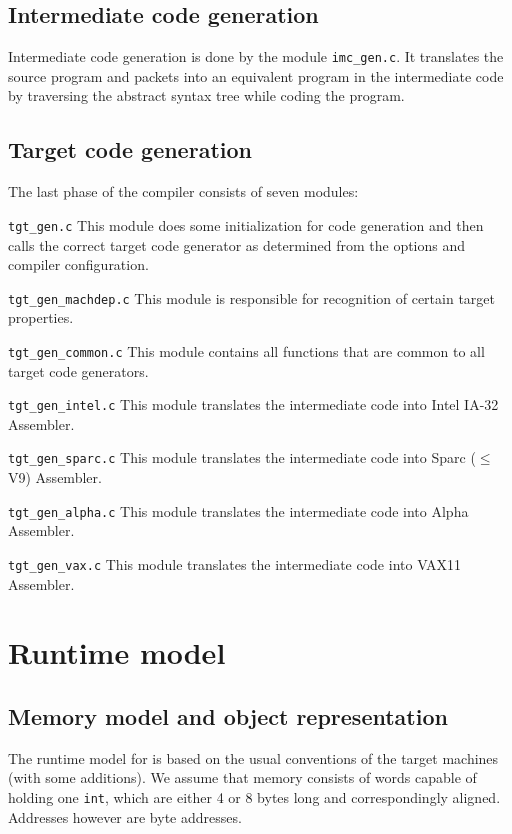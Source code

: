 \documentclass [a4paper,12pt,fleqn]{article}
\begin{document}
\subsection {Intermediate code generation}
Intermediate code generation is done by the module {\tt imc\_gen.c}.
It translates the source program and packets into an equivalent program
in the intermediate code by traversing the abstract syntax tree while
coding the program.
\subsection {Target code generation}
The last phase of the compiler consists of seven modules:
\begin{list}{-}{}
\item [ {\tt tgt\_gen.c} ]
This module does some initialization for code generation and then
calls the correct target code generator as determined from the options
and compiler configuration.
\item [ {\tt tgt\_gen\_machdep.c} ]
This module is responsible for recognition of certain target properties.
\item [ {\tt tgt\_gen\_common.c} ]
This module contains all functions that are common to all target code
generators.
\item [ {\tt tgt\_gen\_intel.c} ]
This module translates the intermediate code into Intel IA-32 Assembler.
\item [ {\tt tgt\_gen\_sparc.c} ]
This module translates the intermediate code into Sparc ($ \leq $V9) Assembler.
\item [ {\tt tgt\_gen\_alpha.c} ]
This module translates the intermediate code into Alpha Assembler.
\item [ {\tt tgt\_gen\_vax.c} ]
This module translates the intermediate code into VAX11 Assembler.
\end{list}
\section {Runtime model}
\subsection {Memory model and object representation}
The runtime model for \ELAN is based on the usual \C conventions of the
target machines (with some additions). We assume that memory consists of
words capable of holding one \verb+int+, which are either 4 or 8 bytes
long and correspondingly aligned. Addresses however are byte addresses.
\end{document}
